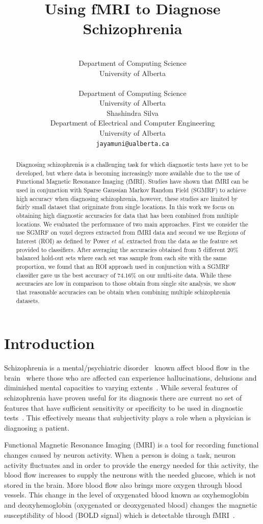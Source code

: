 \documentclass{article} %
\title{Using fMRI to Diagnose Schizophrenia}
\author{%
	\\
	Department of Computing Science\\
	University of Alberta\\
	\texttt{} 
\And 
 \\
Department of Computing Science\\
University of Alberta\\
\texttt{}
\And 
Shashindra Silva\\
Department of Electrical and Computer Engineering\\
University of Alberta\\
\texttt{jayamuni@ualberta.ca}  
}
\begin{document}
	\maketitle

\begin{abstract}
Diagnosing schizophrenia is a challenging task for which diagnostic tests
have yet to be developed, but where data is becoming increasingly more 
available due to the use of Functional Magnetic Resonance Imaging (fMRI).
Studies have shown that fMRI can be used in conjunction with Sparse 
Gaussian Markov Random Field (SGMRF) to achieve high accuracy when diagnosing
schizophrenia, however, these studies are limited by fairly small dataset 
that origninate from single locations. In this work we focus on obtaining
high diagnostic accuracies for data that has been combined from multiple
locations. We evaluated the performance of two main approaches. First 
we consider the use SGMRF on voxel degrees extracted from fMRI data and 
second we use Regions of Interest (ROI) as defined by Power \emph{et al.} 
extracted from the data as the feature set provided to classifiers. 
After averaging the accuracies obtained from 5 different $20\%$ balanced 
hold-out sets where each set was sample from each site with the same 
proportion, we found that an ROI approach used in conjunction with
a SGMRF classifier gave us the best accuracy of $74.16\%$ on our multi-site 
data. While these accuracies are low in comparison to those obtain from
single site analysis, we show that reasonable accuracies can be obtain
when combining multiple schizophrenia datasets.
\end{abstract}


\section{Introduction}
Schizophrenia is a mental/psychiatric disorder~\cite{Rish_2013, Kenji_2010} 
known affect blood flow in the brain~\cite{Kenji_2010} where those who are 
affected can experience hallucinations, delusions and diminished mental 
capacities to varying extents~\cite{jablensky2010diagnostic}. While several
features of schizophrenia have proven useful for its diagnosis there are
current no set of features that have sufficient sensitivity or specificity
to be used in diagnostic tests~\cite{jablensky2010diagnostic, McGuire200891}. 
This effectively means that subjectivity plays a role when a physician is 
diagnosing a patient. 

Functional Magnetic Resonance Imaging (fMRI) is a tool for recording 
functional changes caused by neuron activity\cite{}. When a person is doing a 
task, neuron activity fluctuates and in order to provide the energy 
needed for this activity, the blood flow increases to supply the neurons with 
the needed glucose, which is not stored in the brain\cite{}. More blood flow also 
brings more oxygen through blood vessels. This change in the level of 
oxygenated blood known as oxyhemoglobin and deoxyhemoglobin (oxygenated or 
deoxygenated blood) changes the magnetic susceptibility of blood (BOLD signal) 
which is detectable through fMRI~\cite{}.
\end{document}
